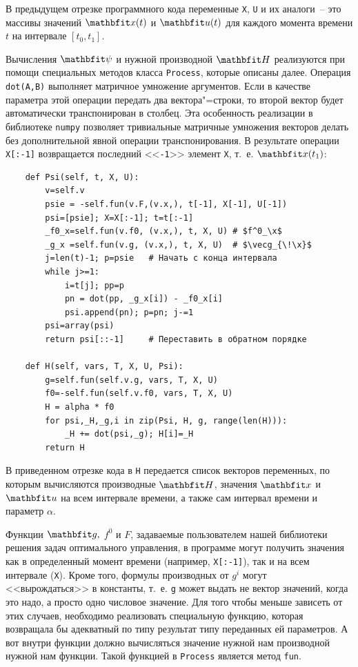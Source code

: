 \documentclass[a4paper,14pt, openany, twoside, final]{extbook} %
\begin{document}
В предыдущем отрезке программного кода переменные \texttt{X}, \texttt{U} и их аналоги~-- это массивы значений $\vecx(t)$ и $\vecu(t)$ для каждого момента времени $t$ на интервале $[t_0,t_1]$.

Вычисления $\vecpsi$ и нужной производной $\vecH$ реализуются при помощи специальных методов класса \texttt{Process}, которые описаны далее.  Операция \texttt{dot(A,B)} выполняет матричное умножение аргументов.  Если в качестве параметра этой операции передать два вектора"=строки, то второй вектор будет автоматически транспонирован в столбец.  Эта особенность реализации в библиотеке \texttt{numpy} позволяет тривиальные матричные умножения векторов делать без дополнительной явной операции транспонирования.  В результате операции \texttt{X[:-1]} возвращается последний <<\texttt{-1}>> элемент \texttt{X}, т.~е. $\x(t_1)$:

\begin{verbatim}
    def Psi(self, t, X, U):
        v=self.v
        psie = -self.fun(v.F,(v.x,), t[-1], X[-1], U[-1])
        psi=[psie]; X=X[:-1]; t=t[:-1]
        _f0_x=self.fun(v.f0, (v.x,), t, X, U) # $f^0_\x$
        _g_x =self.fun(v.g, (v.x,), t, X, U)  # $\vecg_{\!\x}$
        j=len(t)-1; p=psie   # Начать с конца интервала
        while j>=1:
            i=t[j]; pp=p
            pn = dot(pp, _g_x[i]) - _f0_x[i]
            psi.append(pn); p=pn; j-=1
        psi=array(psi)
        return psi[::-1]     # Переставить в обратном порядке

    def H(self, vars, T, X, U, Psi):
        g=self.fun(self.v.g, vars, T, X, U)
        f0=-self.fun(self.v.f0, vars, T, X, U)
        H = alpha * f0
        for psi,_H,_g,i in zip(Psi, H, g, range(len(H))):
            _H += dot(psi,_g); H[i]=_H
        return H
\end{verbatim}

\enlargethispage{-1em}В приведенном отрезке кода в \texttt{H} передается список векторов переменных, по которым вычисляются производные $\vecH$, значения $\vecx$ и $\vecu$ на всем интервале времени, а также сам интервал времени и параметр $\alpha$.

Функции $\vecg,$ $f^0$ и $F$, задаваемые пользователем нашей библиотеки решения задач оптимального управления, в программе могут получить значения как в определенный момент времени (например, \texttt{X[:-1]}), так и на всем интервале (\texttt{X}).  Кроме того, формулы производных от $g^i$ могут <<вырождаться>> в константы, т.~е. \texttt{g} может выдать не вектор значений, когда это надо, а просто одно числовое значение.  Для того чтобы меньше зависеть от этих случаев, необходимо реализовать специальную функцию, которая возвращала бы адекватный по типу результат типу переданных ей параметров.  А вот внутри функции должно вычисляться значение нужной нам производной нужной нам функции.  Такой функцией в \texttt{Process} является метод \texttt{fun}.
\end{document}
